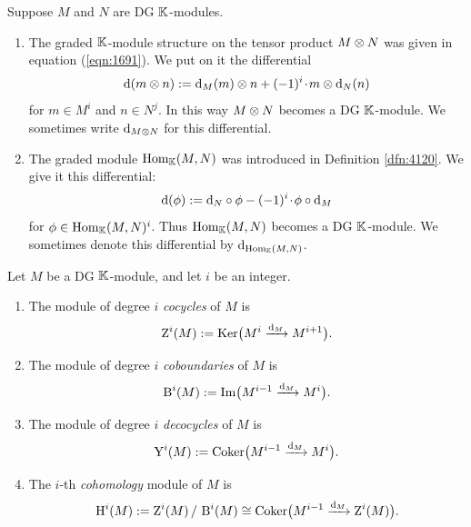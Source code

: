 \begin{dfn} \label{dfn:2992}
Suppose $M$ and $N$ are DG $\mathbb{K}$-modules. 
\begin{enumerate}
\item 
{}
The graded $\mathbb{K}$-module structure on the tensor product $M \otimes N$
was given in equation (\ref{eqn:1691}). 
We put on it the differential 
\[ \mathrm{d}(m \otimes n) := \mathrm{d}_M(m) \otimes n + (-1)^i \mspace{1.5mu}{\cdot}\mspace{1.5mu} m \otimes \mathrm{d}_N(n) \]
for $m \in M^i$ and $n \in N^j$. In this way $M \otimes N$ becomes a DG 
$\mathbb{K}$-module. We sometimes write $\mathrm{d}_{M \otimes N}$ for this differential.

\item 
{}
The graded module $\operatorname{Hom}_{\mathbb{K}}(M, N)$
was introduced in Definition \ref{dfn:4120}. We give it this 
differential: 
\[ \mathrm{d}(\phi) := \mathrm{d}_N \circ \phi - (-1)^i \mspace{1.5mu}{\cdot}\mspace{1.5mu} \phi \circ \mathrm{d}_M \]
for $\phi \in \operatorname{Hom}_{\mathbb{K}}(M, N)^i$. 
Thus $\operatorname{Hom}_{\mathbb{K}}(M, N)$ becomes a DG $\mathbb{K}$-module. 
We sometimes denote this differential by 
$\mathrm{d}_{\operatorname{Hom}_{\mathbb{K}}(M, N)}$.
\end{enumerate}
\end{dfn}

\begin{dfn} \label{dfn:2993}
Let $M$ be a DG $\mathbb{K}$-module, and let $i$ be an integer. 
\begin{enumerate}
\item The module of degree $i$ {\em cocycles}%
%
of $M$ is
\[ \operatorname{Z}^i(M) := \operatorname{Ker} \bigl( M^i \xrightarrow{\mathrm{d}_M} M^{i + 1} \bigr) . \]

\item The module of degree $i$ {\em coboundaries}%
%
of $M$ is 
\[ \operatorname{B}^i(M) := \operatorname{Im} \bigl( M^{i -1} \xrightarrow{\mathrm{d}_M} M^{i} \bigr) . \]

\item The module of degree $i$ {\em decocycles}%
%
of $M$ is 
\[ \operatorname{Y}^i(M) := \operatorname{Coker} \bigl( M^{i -1} \xrightarrow{\mathrm{d}_M} M^{i} \bigr) . \]

\item The $i$-th {\em cohomology}%
%
module of $M$ is 
\[ \operatorname{H}^i(M) := \operatorname{Z}^i(M) \, / \, \operatorname{B}^i(M)
\cong \operatorname{Coker} \bigl( M^{i - 1} \xrightarrow{\mathrm{d}_M} \operatorname{Z}^i(M) \bigr) . \]
\end{enumerate}
\end{dfn}

